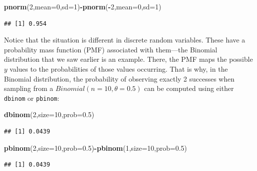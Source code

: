\documentclass[12pt,]{krantz}
\newenvironment{Shaded}{\begin{snugshade}}{\end{snugshade}}
\newcommand{\KeywordTok}[1]{\textcolor[rgb]{0.13,0.29,0.53}{\textbf{#1}}}
\newcommand{\DataTypeTok}[1]{\textcolor[rgb]{0.13,0.29,0.53}{#1}}
\newcommand{\DecValTok}[1]{\textcolor[rgb]{0.00,0.00,0.81}{#1}}
\newcommand{\FloatTok}[1]{\textcolor[rgb]{0.00,0.00,0.81}{#1}}
\newcommand{\OperatorTok}[1]{\textcolor[rgb]{0.81,0.36,0.00}{\textbf{#1}}}
\newcommand{\NormalTok}[1]{#1}
\theoremstyle{definition}
\theoremstyle{definition}
\theoremstyle{definition}
\theoremstyle{remark}
\begin{document}
\begin{Shaded}
\begin{Highlighting}[]
\KeywordTok{pnorm}\NormalTok{(}\DecValTok{2}\NormalTok{,}\DataTypeTok{mean=}\DecValTok{0}\NormalTok{,}\DataTypeTok{sd=}\DecValTok{1}\NormalTok{)}\OperatorTok{-}\KeywordTok{pnorm}\NormalTok{(}\OperatorTok{-}\DecValTok{2}\NormalTok{,}\DataTypeTok{mean=}\DecValTok{0}\NormalTok{,}\DataTypeTok{sd=}\DecValTok{1}\NormalTok{)}
\end{Highlighting}
\end{Shaded}

\begin{verbatim}
## [1] 0.954
\end{verbatim}

Notice that the situation is different in discrete random variables.
These have a probability mass function (PMF) associated with them---the
Binomial distribution that we saw earlier is an example. There, the PMF
maps the possible \(y\) values to the probabilities of those values
occurring. That is why, in the Binomial distribution, the probability of
observing exactly 2 successes when sampling from a
\(Binomial(n=10,\theta=0.5)\) can be computed using either
\texttt{dbinom} or \texttt{pbinom}:

\begin{Shaded}
\begin{Highlighting}[]
\KeywordTok{dbinom}\NormalTok{(}\DecValTok{2}\NormalTok{,}\DataTypeTok{size=}\DecValTok{10}\NormalTok{,}\DataTypeTok{prob=}\FloatTok{0.5}\NormalTok{)}
\end{Highlighting}
\end{Shaded}

\begin{verbatim}
## [1] 0.0439
\end{verbatim}

\begin{Shaded}
\begin{Highlighting}[]
\KeywordTok{pbinom}\NormalTok{(}\DecValTok{2}\NormalTok{,}\DataTypeTok{size=}\DecValTok{10}\NormalTok{,}\DataTypeTok{prob=}\FloatTok{0.5}\NormalTok{)}\OperatorTok{-}\KeywordTok{pbinom}\NormalTok{(}\DecValTok{1}\NormalTok{,}\DataTypeTok{size=}\DecValTok{10}\NormalTok{,}\DataTypeTok{prob=}\FloatTok{0.5}\NormalTok{)}
\end{Highlighting}
\end{Shaded}

\begin{verbatim}
## [1] 0.0439
\end{verbatim}
\end{document}
